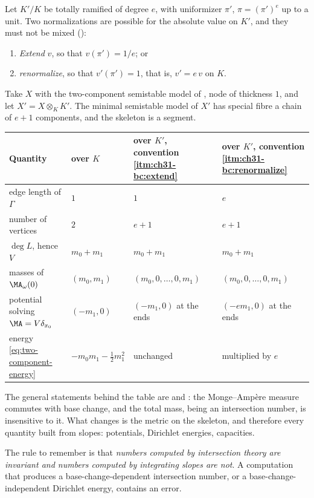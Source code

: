\begin{example}
\label{ex:ch31-base-change}
Let \(K'/K\) be totally ramified of degree \(e\), with uniformizer
\(\pi'\), \(\pi=(\pi')^e\) up to a unit.  Two normalizations are possible
for the absolute value on \(K'\), and they must not be mixed
():
\begin{enumerate}
\item\label{itm:ch31-bc:extend} \emph{Extend} \(v\), so that
 \(v(\pi')=1/e\); or
\item\label{itm:ch31-bc:renormalize} \emph{renormalize}, so that
 \(v'(\pi')=1\), that is, \(v'=e\,v\) on \(K\).
\end{enumerate}
Take \(X\) with the two-component semistable model of
, node of thickness \(1\), and let
\(X'=X\otimes_KK'\).  The minimal semistable model of \(X'\) has special
fibre a chain of \(e+1\) components, and the skeleton is a segment.
\begin{center}
\small
\begin{tabular}{p{}|p{}|p{}|p{}}
\toprule
\textbf{Quantity}&\textbf{over \(K\)}
 &\textbf{over \(K'\), convention \cref{itm:ch31-bc:extend}}
 &\textbf{over \(K'\), convention \cref{itm:ch31-bc:renormalize}}\\
\midrule
edge length of \(\Gamma\)&\(1\)&\(1\)&\(e\)\\
number of vertices&\(2\)&\(e+1\)&\(e+1\)\\
\(\deg L\), hence \(V\)&\(m_0+m_1\)&\(m_0+m_1\)&\(m_0+m_1\)\\
masses of \(\MA_\omega(0)\)&\((m_0,m_1)\)&\((m_0,0,\ldots,0,m_1)\)
 &\((m_0,0,\ldots,0,m_1)\)\\
potential solving \(\MA=V\delta_{x_0}\)&\((-m_1,0)\)
 &\((-m_1,0)\) at the ends&\((-em_1,0)\) at the ends\\
energy \eqref{eq:two-component-energy}&\(-m_0m_1-\tfrac12m_1^2\)
 &unchanged&multiplied by \(e\)\\
\bottomrule
\end{tabular}
\end{center}
The general statements behind the table are
 and : the
Monge--Amp\`ere measure commutes with base change, and the total mass, being
an intersection number, is insensitive to it.  What changes is the metric on
the skeleton, and therefore every quantity built from slopes: potentials,
Dirichlet energies, capacities.

The rule to remember is that \emph{numbers computed by intersection theory
are invariant and numbers computed by integrating slopes are not}.  A
computation that produces a base-change-dependent intersection number, or a
base-change-independent Dirichlet energy, contains an error.
\end{example}

